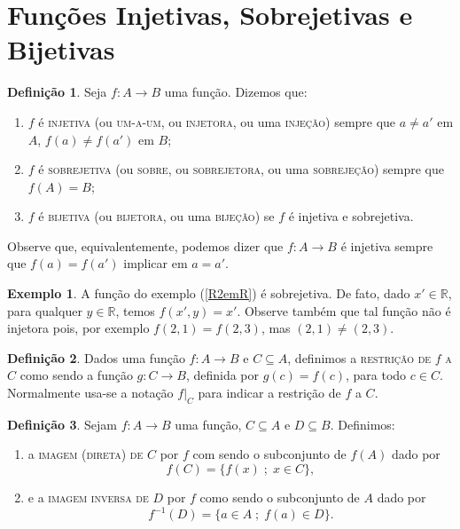 \documentclass[a4paper,12pt]{monografia}
\theoremstyle{plain}
\theoremstyle{definition}
\newtheorem{definition}{Defini\c{c}\~ao}[section]
\newtheorem{example}{Exemplo}[section]
\theoremstyle{remark}
\newcommand{\R}{\mathbb{R}}
\begin{document}
\section{Fun\c{c}\~oes Injetivas, Sobrejetivas e Bijetivas}

\begin{definition}
Seja $f:A \rightarrow B$ uma fun\c{c}\~ao. Dizemos que:
\begin{enumerate}
    \item $f$ \'e \textsc{injetiva} (ou \textsc{um-a-um}, ou \textsc{injetora}, ou uma
    \textsc{inje\c{c}\~ao}) sempre que $a \neq a'$ em $A$, $f(a)\neq
    f(a')$ em $B$;
    \item $f$ \'e \textsc{sobrejetiva} (ou \textsc{sobre}, ou \textsc{sobrejetora}, ou uma
    \textsc{sobreje\c{c}\~ao}) sempre que $f(A)=B$;
    \item $f$ \'e  \textsc{bijetiva} (ou \textsc{bijetora}, ou uma \textsc{bije\c{c}\~ao}) se $f$
    \'e injetiva e sobrejetiva.
\end{enumerate}
\end{definition}

Observe que, equivalentemente, podemos dizer que $f:A \rightarrow
B$ \'e injetiva sempre que $f(a)=f(a')$ implicar em $a=a'$.

\begin{example}
A fun\c{c}\~ao do exemplo (\ref{R2emR}) \'e sobrejetiva. De fato, dado $x'
\in \R$, para qualquer $y \in \R$, temos $f(x',y)=x'$. Observe
tamb\'em que tal fun\c{c}\~ao n\~ao \'e injetora pois, por exemplo
$f(2,1)=f(2,3)$, mas $(2,1)\neq (2,3)$.
\end{example}
\begin{definition}
Dados uma fun\c{c}\~ao $f:A \rightarrow B$ e $C\subseteq A$, definimos a
\textsc{restri\c{c}\~ao de} $f$ \textsc{a} $C$ como sendo a fun\c{c}\~ao $g:C
\rightarrow B$, definida por $g(c)=f(c)$, para todo $c \in C$.
Normalmente usa-se a nota\c{c}\~ao $f|_C$ para indicar a restri\c{c}\~ao de
$f$ a $C$.
\end{definition}
\begin{definition}
Sejam $f:A \rightarrow B$ uma fun\c{c}\~ao, $C \subseteq A$ e $D
\subseteq B$. Definimos:
\begin{enumerate}
    \item a \textsc{imagem (direta) de} $C$ por $f$ com sendo o subconjunto
    de $f(A)$ dado por
    $$
     f(C)=\{f(x)\;;\; x \in C \},
    $$
    \item  e a \textsc{imagem inversa de} $D$ por $f$ como sendo o subconjunto
    de $A$ dado por
    $$
    f^{-1}(D)=\{a \in A\;;\; f(a) \in D \}.
    $$
\end{enumerate}
\end{definition}
\end{document}
